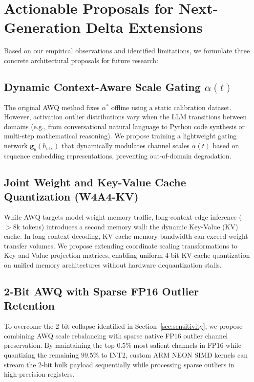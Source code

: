 \documentclass[conference]{IEEEtran}
\begin{document}
\section{Actionable Proposals for Next-Generation Delta Extensions}
Based on our empirical observations and identified limitations, we formulate three concrete architectural proposals for future research:

\subsection{Dynamic Context-Aware Scale Gating \texorpdfstring{$\alpha(t)$}{alpha(t)}}
The original AWQ method fixes $\alpha^*$ offline using a static calibration dataset. However, activation outlier distributions vary when the LLM transitions between domains (e.g., from conversational natural language to Python code synthesis or multi-step mathematical reasoning). We propose training a lightweight gating network $\mathbf{g}_\theta(h_{\text{ctx}})$ that dynamically modulates channel scales $\alpha(t)$ based on sequence embedding representations, preventing out-of-domain degradation.

\subsection{Joint Weight and Key-Value Cache Quantization (W4A4-KV)}
While AWQ targets model weight memory traffic, long-context edge inference ($>8\text{k}$ tokens) introduces a second memory wall: the dynamic Key-Value (KV) cache. In long-context decoding, KV-cache memory bandwidth can exceed weight transfer volumes. We propose extending coordinate scaling transformations to Key and Value projection matrices, enabling uniform 4-bit KV-cache quantization on unified memory architectures without hardware dequantization stalls.

\subsection{2-Bit AWQ with Sparse FP16 Outlier Retention}
To overcome the 2-bit collapse identified in Section~\ref{sec:sensitivity}, we propose combining AWQ scale rebalancing with sparse native FP16 outlier channel preservation. By maintaining the top $0.5\%$ most salient channels in FP16 while quantizing the remaining $99.5\%$ to INT2, custom ARM NEON SIMD kernels can stream the 2-bit bulk payload sequentially while processing sparse outliers in high-precision registers.
\end{document}
